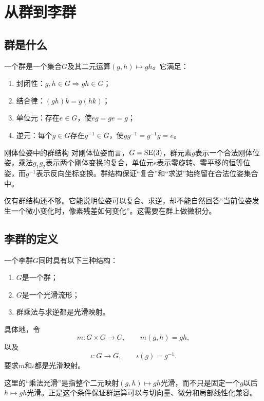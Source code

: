 \section{从群到李群}

\subsection{群是什么}

\begin{definition}[群]
一个群是一个集合$G$及其二元运算$(g,h)\mapsto gh$。它满足：
\begin{enumerate}
    \item 封闭性：$g,h\in G\Longrightarrow gh\in G$；
    \item 结合律：$(gh)k=g(hk)$；
    \item 单位元：存在$e\in G$，使$eg=ge=g$；
    \item 逆元：每个$g\in G$存在$g^{-1}\in G$，使$gg^{-1}=g^{-1}g=e$。
\end{enumerate}
\end{definition}

\begin{lieexample}{刚体位姿中的群结构}
对刚体位姿而言，$G=\operatorname{SE}(3)$，群元素$g$表示一个合法刚体位姿，乘法$g_1g_2$表示两个刚体变换的复合，单位元$e$表示零旋转、零平移的恒等位姿，而$g^{-1}$表示反向坐标变换。群结构保证“复合”和“求逆”始终留在合法位姿集合中。
\end{lieexample}

仅有群结构还不够。它能说明位姿可以复合、求逆，却不能自然回答“当前位姿发生一个微小变化时，像素残差如何变化”。这需要在群上做微积分。

\subsection{李群的定义}

\begin{definition}[李群]
一个李群$G$同时具有以下三种结构：
\begin{enumerate}
    \item $G$是一个群；
    \item $G$是一个光滑流形；
    \item 群乘法与求逆都是光滑映射。
\end{enumerate}
具体地，令
\[
    m:G\times G\to G,\qquad m(g,h)=gh,
\]
以及
\[
    \iota:G\to G,\qquad \iota(g)=g^{-1}.
\]
要求$m$和$\iota$都是光滑映射。
\end{definition}

这里的“乘法光滑”是指整个二元映射$(g,h)\mapsto gh$光滑，而不只是固定一个$g$以后$h\mapsto gh$光滑。正是这个条件保证群运算可以与切向量、微分和局部线性化兼容。

